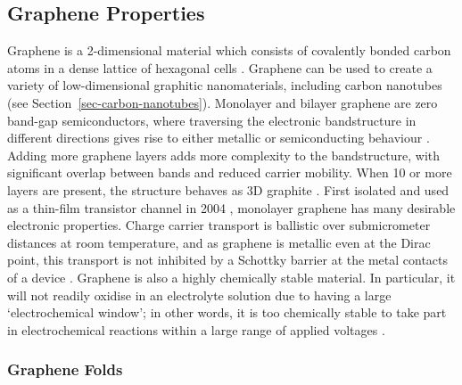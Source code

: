 \documentclass[
  a4paper,
]{scrbook}
\begin{document}
\hypertarget{graphene-properties}{%
\subsection{Graphene Properties}\label{graphene-properties}}

Graphene is a 2-dimensional material which consists of covalently bonded
carbon atoms in a dense lattice of hexagonal cells
\autocite{McEuen2002,Novoselov2004,Geim2007,Tran2016}. Graphene can be
used to create a variety of low-dimensional graphitic nanomaterials,
including carbon nanotubes \autocite{McEuen2002} (see
Section~\ref{sec-carbon-nanotubes}). Monolayer and bilayer graphene are
zero band-gap semiconductors, where traversing the electronic
bandstructure in different directions gives rise to either metallic or
semiconducting behaviour \autocite{McEuen2002,Peng2018}. Adding more
graphene layers adds more complexity to the bandstructure, with
significant overlap between bands and reduced carrier mobility. When 10
or more layers are present, the structure behaves as 3D graphite
\autocite{Geim2007,Ohno2015}. First isolated and used as a thin-film
transistor channel in 2004 \autocite{Novoselov2004}, monolayer graphene
has many desirable electronic properties. Charge carrier transport is
ballistic over submicrometer distances at room temperature, and as
graphene is metallic even at the Dirac point, this transport is not
inhibited by a Schottky barrier at the metal contacts of a device
\autocite{Novoselov2004,Geim2007,Peng2018}. Graphene is also a highly
chemically stable material. In particular, it will not readily oxidise
in an electrolyte solution due to having a large `electrochemical
window'; in other words, it is too chemically stable to take part in
electrochemical reactions within a large range of applied voltages
\autocite{Ohno2015,Tran2016}.

\hypertarget{graphene-folds}{%
\subsubsection*{Graphene Folds}\label{graphene-folds}}
\end{document}
